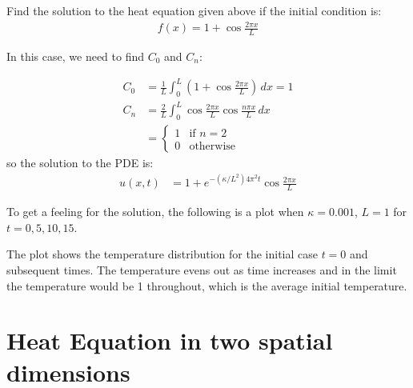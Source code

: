 \begin{example}
Find the solution to the heat equation given above if the initial condition is:
%
\begin{align*}
f(x) = 1+\cos \frac{2\pi x}{L}
\end{align*}

\solution

In this case, we need to find $C_0$ and $C_n$:

\begin{align*}
C_0 & = \frac{1}{L} \int_0^L (1+ \cos \frac{2\pi x}{L}) \, dx  = 1 \\
C_n& = \frac{2}{L} \int_0^L \cos \frac{2\pi x}{L} \cos \frac{n \pi x}{L} \, dx \\
& = \begin{cases}
1 & \text{if $n=2$} \\
0 & \text{otherwise}
\end{cases}
\end{align*}
so the solution to the PDE is:
%
\begin{align*}
u(x,t) & = 1 + e^{-(\kappa/L^2) 4 \pi^2 t } \cos \frac{2\pi x}{L}
\end{align*}

To get a feeling for the solution, the following is a plot when $\kappa=0.001$, $L=1$ for $t=0,5,10,15$.


\begin{center}
\end{center}

The plot shows the temperature distribution for the initial case $t=0$ and subsequent times.  The temperature evens out as time increases and in the limit the temperature would be 1 throughout, which is the average initial temperature.

\end{example}


\section{Heat Equation in two spatial dimensions}

